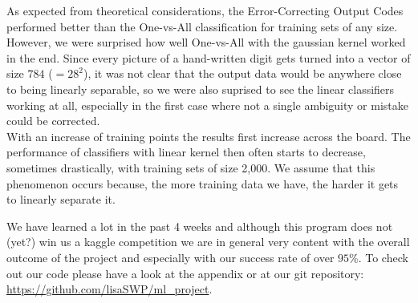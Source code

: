\smallskip
As expected from theoretical considerations, the Error-Correcting Output Codes performed better than the One-vs-All classification for training sets of any size. However, we were surprised how well One-vs-All with the gaussian kernel worked in the end. Since every picture of a hand-written digit gets turned into a vector of size $784$  ($=28^2$), it was not clear that the output data would be anywhere close to being linearly separable, so we were also suprised to see the linear classifiers working at all, especially in the first case where not a single ambiguity or mistake could be corrected.\\
With an increase of training points the results first increase across the board. The performance of classifiers with linear kernel then often starts to decrease, sometimes drastically, with training sets of size 2,000. We assume that this phenomenon occurs because, the more training data we have, the harder it gets to linearly separate it. 


\smallskip
We have learned a lot in the past 4 weeks and although this program does not (yet?) win us a kaggle competition we are in general very content with the overall outcome of the project and especially with our success rate of over $95$\%. To check out our code please have a look at the appendix or at our git repository:  \url{https://github.com/lisaSWP/ml_project}.
